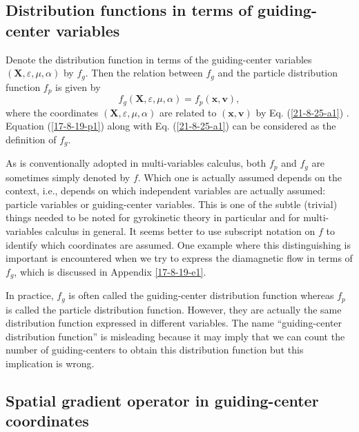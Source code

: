 \documentclass{llncs}
\begin{document}
\subsection{Distribution functions in terms of guiding-center variables}

Denote the distribution function in terms of the guiding-center variables
$(\mathbf{X}, \varepsilon, \mu, \alpha)$ by $f_g$. Then the relation between
$f_g$ and the particle distribution function $f_p$ is given by
\begin{equation}
  \label{17-8-19-p1} f_g (\mathbf{X}, \varepsilon, \mu, \alpha) = f_p
  (\mathbf{x}, \mathbf{v}),
\end{equation}
where the coordinates $(\mathbf{X}, \varepsilon, \mu, \alpha)$ are related to
$(\mathbf{x}, \mathbf{v})$ by Eq. (\ref{21-8-25-a1}) . Equation
(\ref{17-8-19-p1}) along with Eq. (\ref{21-8-25-a1}) can be considered as the
definition of $f_g$.

As is conventionally adopted in multi-variables calculus, both $f_p$ and $f_g$
are sometimes simply denoted by $f$. Which one is actually assumed depends on
the context, i.e., depends on which independent variables are actually
assumed: particle variables or guiding-center variables. This is one of the
subtle (trivial) things needed to be noted for gyrokinetic theory in
particular and for multi-variables calculus in general. It seems better to use
subscript notation on $f$ to identify which coordinates are assumed. One
example where this distinguishing is important is encountered when we try to
express the diamagnetic flow in terms of $f_g$, which is discussed in Appendix
\ref{17-8-19-e1}.

In practice, $f_g$ is often called the guiding-center distribution function
whereas $f_p$ is called the particle distribution function. However, they are
actually the same distribution function expressed in different variables. The
name ``guiding-center distribution function'' is misleading because it may
imply that we can count the number of guiding-centers to obtain this
distribution function but this implication is wrong.

\subsection{Spatial gradient operator in guiding-center coordinates}
\end{document}
